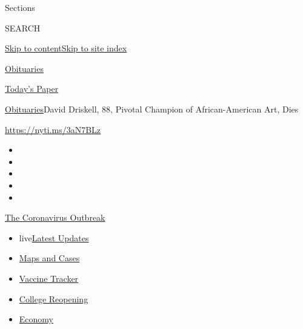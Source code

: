 Sections

SEARCH

\protect\hyperlink{site-content}{Skip to
content}\protect\hyperlink{site-index}{Skip to site index}

\href{https://www.nytimes.com/section/obituaries}{Obituaries}

\href{https://myaccount.nytimes.com/auth/login?response_type=cookie\&client_id=vi}{}

\href{https://www.nytimes.com/section/todayspaper}{Today's Paper}

\href{/section/obituaries}{Obituaries}\textbar{}David Driskell, 88,
Pivotal Champion of African-American Art, Dies

\url{https://nyti.ms/3aN7BLz}

\begin{itemize}
\item
\item
\item
\item
\item
\end{itemize}

\href{https://www.nytimes.com/news-event/coronavirus?action=click\&pgtype=Article\&state=default\&region=TOP_BANNER\&context=storylines_menu}{The
Coronavirus Outbreak}

\begin{itemize}
\tightlist
\item
  live\href{https://www.nytimes.com/2020/08/03/world/coronavirus-covid-19.html?action=click\&pgtype=Article\&state=default\&region=TOP_BANNER\&context=storylines_menu}{Latest
  Updates}
\item
  \href{https://www.nytimes.com/interactive/2020/us/coronavirus-us-cases.html?action=click\&pgtype=Article\&state=default\&region=TOP_BANNER\&context=storylines_menu}{Maps
  and Cases}
\item
  \href{https://www.nytimes.com/interactive/2020/science/coronavirus-vaccine-tracker.html?action=click\&pgtype=Article\&state=default\&region=TOP_BANNER\&context=storylines_menu}{Vaccine
  Tracker}
\item
  \href{https://www.nytimes.com/2020/08/02/us/covid-college-reopening.html?action=click\&pgtype=Article\&state=default\&region=TOP_BANNER\&context=storylines_menu}{College
  Reopening}
\item
  \href{https://www.nytimes.com/live/2020/08/03/business/stock-market-today-coronavirus?action=click\&pgtype=Article\&state=default\&region=TOP_BANNER\&context=storylines_menu}{Economy}
\end{itemize}

